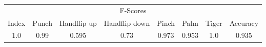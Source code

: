 \documentclass{standalone}
\begin{document}
 
 \begin{tabular}{|c|c|c|c|c|c|c ||c|}
\cline{1-8}\multicolumn{8}{|c|}{F-Scores} \\ 
\cline{1-8}Index & Punch & Handflip up & Handflip down & Pinch & Palm & Tiger & Accuracy\\ 
\cline{1-8}1.0 & 0.99 & 0.595 & 0.73 & 0.973 & 0.953 & 1.0 & 0.935\\ 
 \cline{1-8}\hline \end{tabular}
 
\end{document}
